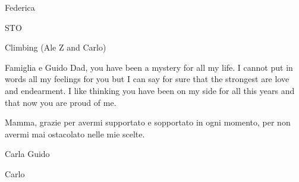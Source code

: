Federica

STO

Climbing (Ale Z and Carlo)

Famiglia e Guido
Dad, you have been a mystery for all my life. I cannot put in words all my feelings for you but I can say for sure that the strongest are love and endearment. 
I like thinking you have been on my side for all this years and that now you are proud of me.

Mamma, grazie per avermi supportato e sopportato in ogni momento, per non avermi mai ostacolato nelle mie scelte. 

Carla 
Guido

Carlo





